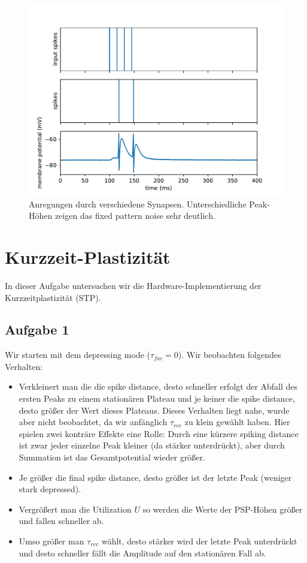 \documentclass[10pt,a4paper]{scrartcl}
\begin{document}
\begin{figure} [ht]
\begin{center}
\label{fig:abb11}
\caption{Anregungen durch verschiedene Synapsen. Unterschiedliche Peak-Höhen zeigen das fixed pattern noise sehr deutlich.}
\includegraphics[scale=0.5]{pictures/resonant_firing.pdf} 
\end{center}
\end{figure}


\newpage


\section{Kurzzeit-Plastizität}
In dieser Aufgabe untersuchen wir die Hardware-Implementierung der Kurzzeitplastizität (STP). 

\subsection{Aufgabe 1}
Wir starten mit dem depressing mode ($\tau_{fac} = 0$). Wir beobachten folgendes Verhalten:
\begin{itemize}
\item Verkleinert man die die spike distance, desto schneller erfolgt der Abfall des ersten Peaks zu einem stationären Plateau und je keiner die spike distance, desto größer der Wert dieses Plateaus. Dieses Verhalten liegt nahe, wurde aber nicht beobachtet, da wir anfänglich $\tau_{rec}$ zu klein gewählt haben. Hier spielen zwei konträre Effekte eine Rolle: Durch eine kürzere spiking distance ist zwar jeder einzelne Peak kleiner (da stärker unterdrückt), aber durch Summation ist das Gesamtpotential wieder größer.
\item Je größer die final spike distance, desto größer ist der letzte Peak (weniger stark depressed).
\item Vergrößert man die Utilization $U$ so werden die Werte der PSP-Höhen größer und fallen schneller ab.
\item Umso größer man $\tau_{rec}$ wählt, desto stärker wird der letzte Peak unterdrückt und desto schneller fällt die Amplitude auf den stationären Fall ab.
\end{itemize} 
\end{document}
